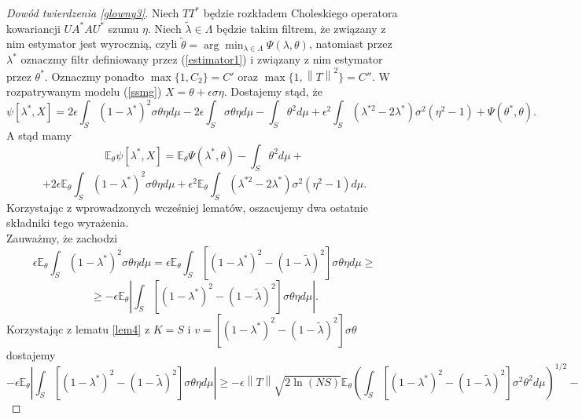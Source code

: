 \documentclass{mwart}
\newcommand{\norm}[1]{\left\lVert#1\right\rVert}
\begin{document}
\begin{proof}[Dowód twierdzenia \ref{glowny3}]
Niech $TT^*$ będzie rozkładem Choleskiego operatora kowariancji $UA^*AU^*$ szumu $\eta$. Niech $\tilde{\lambda}\in \Lambda$ będzie takim filtrem, że związany z nim estymator jest wyrocznią, czyli $\tilde{\theta}=\arg \min_{\lambda\in \Lambda}\Psi(\lambda,\theta)$, natomiast przez $\lambda^*$ oznaczmy filtr definiowany przez (\ref{estimator1}) i związany z nim estymator przez $\theta^*$. Oznaczmy ponadto $\max\{1,C_2\}=C'$ oraz $\max\{1,\norm{T}^2\}=C''$.
W rozpatrywanym modelu (\ref{ssmg}) $X=\theta+\epsilon\sigma\eta$. Dostajemy stąd, że 
\begin{displaymath}
\psi[\lambda^*,X]=2\epsilon\int_S(1-\lambda^*)^2\sigma \theta\eta d\mu-2\epsilon\int_S\sigma \theta \eta d\mu-\int_S\theta ^2d\mu+\epsilon^2\int_S(\lambda^{*2}-2\lambda^*)\sigma^2(\eta^2-1)+\Psi(\theta^*,\theta).
\end{displaymath}
A stąd mamy
\begin{displaymath}
\mathbb{E}_{\theta}\psi[\lambda^*,X]=\mathbb{E}_{\theta}\Psi(\lambda^*,\theta)-\int_S\theta ^2d\mu+
\end{displaymath}
\begin{displaymath}
+2\epsilon\mathbb{E}_{\theta}\int_S(1-\lambda^*)^2\sigma \theta \eta d\mu+\epsilon^2\mathbb{E}_{\theta}\int_S(\lambda^{*2}-2\lambda^*)\sigma^2(\eta^2-1)d\mu.
\end{displaymath}
Korzystając z wprowadzonych wcześniej lematów, oszacujemy dwa ostatnie składniki tego wyrażenia.\\
Zauważmy, że zachodzi
\begin{displaymath}
\epsilon\mathbb{E}_{\theta}\int_S(1-\lambda^*)^2\sigma \theta \eta d\mu=
\epsilon\mathbb{E}_{\theta}\int_S[(1-\lambda^*)^2-(1-\tilde{\lambda})^2]\sigma \theta \eta d\mu\geq
\end{displaymath}
\begin{displaymath}
\geq -\epsilon\mathbb{E}_{\theta}\left|\int_S[(1-\lambda^*)^2-(1-\tilde{\lambda})^2]\sigma \theta \eta d\mu\right|.
\end{displaymath}
Korzystając z lematu \ref{lem4} z $K=S$ i $v=[(1-\lambda^*)^2-(1-\tilde{\lambda})^2]\sigma \theta $ dostajemy
\begin{displaymath}
-\epsilon\mathbb{E}_{\theta}\left|\int_S[(1-\lambda^*)^2-(1-\tilde{\lambda})^2]\sigma \theta \eta d\mu\right|\geq -\epsilon\norm{T}\sqrt{2\ln (NS)}\mathbb{E}_{\theta}\left(\int_S[(1-\lambda^*)^2-(1-\tilde{\lambda})^2]\sigma^2\theta ^2 d\mu\right)^{1/2}-
\end{displaymath}

\end{proof}
\end{document}
